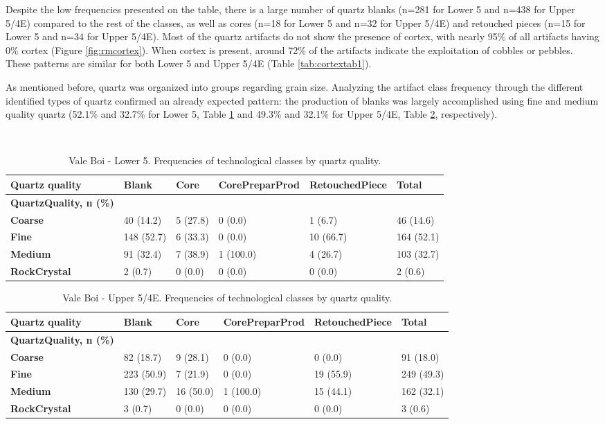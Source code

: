 \documentclass[12pt,twoside]{reedthesis}
\begin{document}
Despite the low frequencies presented on the table, there is a large number of quartz blanks (n=281 for Lower 5 and n=438 for Upper 5/4E) compared to the rest of the classes, as well as cores (n=18 for Lower 5 and n=32 for Upper 5/4E) and retouched pieces (n=15 for Lower 5 and n=34 for Upper 5/4E).
Most of the quartz artifacts do not show the presence of cortex, with nearly 95\% of all artifacts having 0\% cortex (Figure \ref{fig:rmcortex}). When cortex is present, around 72\% of the artifacts indicate the exploitation of cobbles or pebbles. These patterns are similar for both Lower 5 and Upper 5/4E (Table \ref{tab:cortextab1}).

As mentioned before, quartz was organized into groups regarding grain size. Analyzing the artifact class frequency through the different identified types of quartz confirmed an already expected pattern: the production of blanks was largely accomplished using fine and medium quality quartz (52.1\% and 32.7\% for Lower 5, Table \ref{tab:quartzquality1} and 49.3\% and 32.1\% for Upper 5/4E, Table \ref{tab:quartzquality2}, respectively).

~
\begin{table}[!h]

\caption{\label{tab:quartzquality1}Vale Boi - Lower 5. Frequencies of technological classes by quartz quality.}
\centering
\fontsize{9}{11}\selectfont
\begin{tabular}[t]{>{\bfseries}llllll}
\toprule
Quartz quality & Blank & Core & CorePreparProd & RetouchedPiece & Total\\
\midrule
QuartzQuality, n (\%) &  &  &  &  & \\
Coarse & 40 (14.2) & 5 (27.8) & 0 (0.0) & 1 (6.7) & 46 (14.6)\\
Fine & 148 (52.7) & 6 (33.3) & 0 (0.0) & 10 (66.7) & 164 (52.1)\\
Medium & 91 (32.4) & 7 (38.9) & 1 (100.0) & 4 (26.7) & 103 (32.7)\\
RockCrystal & 2 (0.7) & 0 (0.0) & 0 (0.0) & 0 (0.0) & 2 (0.6)\\
\bottomrule
\end{tabular}
\end{table}
\begin{table}[!h]

\caption{\label{tab:quartzquality2}Vale Boi - Upper 5/4E. Frequencies of technological classes by quartz quality.}
\centering
\fontsize{9}{11}\selectfont
\begin{tabular}[t]{>{\bfseries}llllll}
\toprule
Quartz quality & Blank & Core & CorePreparProd & RetouchedPiece & Total\\
\midrule
QuartzQuality, n (\%) &  &  &  &  & \\
Coarse & 82 (18.7) & 9 (28.1) & 0 (0.0) & 0 (0.0) & 91 (18.0)\\
Fine & 223 (50.9) & 7 (21.9) & 0 (0.0) & 19 (55.9) & 249 (49.3)\\
Medium & 130 (29.7) & 16 (50.0) & 1 (100.0) & 15 (44.1) & 162 (32.1)\\
RockCrystal & 3 (0.7) & 0 (0.0) & 0 (0.0) & 0 (0.0) & 3 (0.6)\\
\bottomrule
\end{tabular}
\end{table}
~
\end{document}
